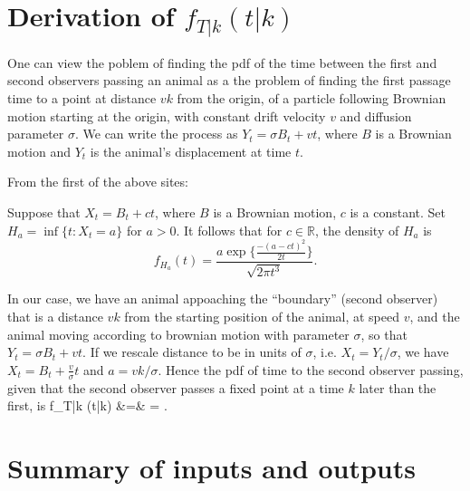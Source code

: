 \documentclass[useAMS, usenatbib, referee]{biom}
\begin{document}
\appendix

\section{Derivation of $f_{T|k}(t|k)$}
\label{appx:firstpassage}

One can view the poblem of finding the pdf of the time between the first and second observers passing an animal as a the problem of finding the first passage time to a point at distance $vk$ from the origin, of a particle following Brownian motion starting at the origin, with constant drift velocity $v$ and diffusion parameter $\sigma$. We can write the process as $Y_t=\sigma B_t+vt$, where $B$ is a Brownian motion and $Y_t$ is the animal's displacement at time $t$. 


From the first of the above sites:

Suppose that $X_t=B_t+ct$, where $B$ is a Brownian motion, $c$ is a constant. Set $H_a=\inf\{t: X_t=a\}$ for $a>0$. It follows that for $c\in\mathbb{R}$, the density of $H_a$ is 
\begin{equation}
f_{H_a} (t) = \frac{ a \exp \Big\{ \frac{- (a-ct)^2}{2t} \Big\} }{\sqrt{2 \pi t^3}}.
\end{equation}

In our case, we have an animal appoaching the ``boundary'' (second observer) that is a distance $vk$ from the starting position of the animal, at speed $v$, and the animal moving according to brownian motion with parameter $\sigma$, so that $Y_t=\sigma B_t+vt$. If we rescale distance to be in units of $\sigma$, i.e. $X_t=Y_t/\sigma$, we have $X_t=B_t+\frac{v}{\sigma}t$ and $a=vk/\sigma$. Hence the pdf of time to the second observer passing, given that the second observer passes a fixed point at a time $k$ later than the first, is
\be
f_{T|k} (t|k)
&=&
\;=\;
.
\ee




\section{Summary of inputs and outputs\label{appx:notation}}
\end{document}
